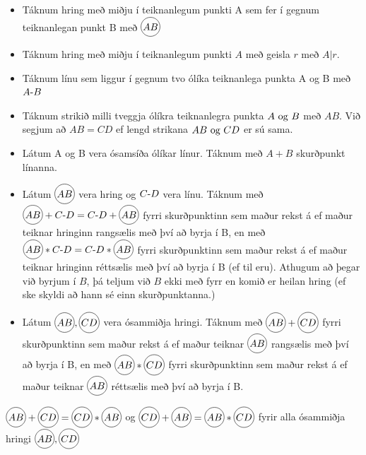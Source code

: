 \begin{frame}
  \begin{skgr}[Táknmál]
    \begin{itemize}
    \item Táknum hring með miðju í teiknanlegum punkti A sem fer í gegnum
      teiknanlegan punkt B með \( \hri{AB} \)
    \item Táknum hring með miðju í teiknanlegum punkti \(A\) með geisla \(r\)
      með \(A|r\).
    \item Táknum línu sem liggur í gegnum tvo ólíka teiknanlega punkta A og B
      með \(\lin{A}{B}\)
    \item Táknum strikið milli tveggja ólíkra teiknanlegra punkta \(A \Og B\)
      með \(AB\). Við segjum að \(AB = CD\) ef lengd strikana \(AB \Og CD\)
      er sú sama.
      \end{itemize}
  \end{skgr}
\end{frame}
\begin{frame}
  \begin{skgr}
    \begin{itemize}
    \item Látum A og B vera ósamsíða ólíkar línur. Táknum með  \(A + B\)
      skurðpunkt línanna.
    \item Látum \(\hri{AB}\) vera hring og \(\lin{C}{D}\) vera línu.
      Táknum með \(\hri{AB} + \lin{C}{D} = \lin{C}{D} + \hri{AB} \) fyrri skurðpunktinn sem maður
      rekst á ef maður teiknar hringinn rangsælis með því að byrja
      í B, en með
      \(\hri{AB} * \lin{C}{D} = \lin{C}{D} * \hri{AB}\) fyrri skurðpunktinn sem maður rekst
      á ef maður teiknar hringinn réttsælis með því að byrja í B (ef til eru).
      Athugum að þegar við byrjum í \(B\), þá teljum við \(B\) ekki með fyrr en
      komið er heilan hring (ef ske skyldi að hann sé einn skurðpunktanna.)
    \end{itemize}
  \end{skgr}
\end{frame}
\begin{frame}
  \begin{skgr} 
    \begin{itemize}
    \item Látum \(\hri{AB}, \hri{CD}\)
      vera ósammiðja hringi.  Táknum með \(\hri{AB} + \hri{CD} \)
      fyrri skurðpunktinn sem maður rekst á ef maður teiknar \(\hri{AB}\)
      rangsælis með því að byrja í B, en með \(\hri{AB} * \hri{CD} \)
      fyrri skurðpunktinn sem maður rekst á ef maður teiknar \(\hri{AB}\)
      réttsælis með því að byrja í B.
    \end{itemize}
  \end{skgr}
    \begin{ath}
      \(\hri{AB} + \hri{CD} = \hri{CD} * \hri{AB} \)
      og \(\hri{CD} + \hri{AB} = \hri{AB} * \hri{CD} \)
      fyrir alla ósammiðja hringi \(\hri{AB}, \hri{CD}\)
    \end{ath}
  \end{frame}

